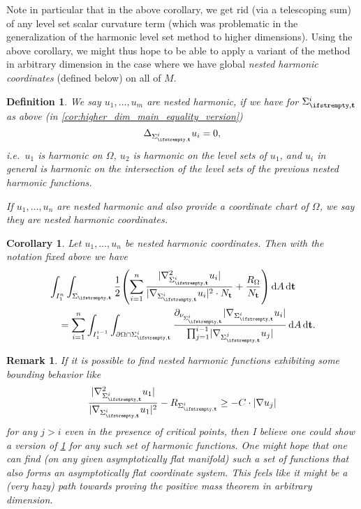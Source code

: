\documentclass[draft]{amsart}
\newtheorem{corollary}[theorem]{Corollary}
\newtheorem{remark}[theorem]{Remark}
\newtheorem{definition}[theorem]{Definition}
\newcommand*{\mathcomma}{,}
\newcommand*{\mathfullstop}{.}
\DeclarePairedDelimiter{\parens}{(}{)}
\let\p\parens %
\newcommand*{\laplacian}{\Delta}
\newcommand*{\boundary}{\partial}
\DeclarePairedDelimiter{\abs}{\lvert}{\rvert} %
\begin{document}
Note in particular that in the above corollary, we get rid (via a telescoping sum) of any level set scalar curvature term (which was problematic in the generalization of the harmonic level set method to higher dimensions). Using the above corollary, we might thus hope to be able to apply a variant of the method in arbitrary dimension in the case where we have global \emph{nested harmonic coordinates} (defined below) on all of \( M \). 

\begin{definition}
    We say \( u_1,\dotsc,u_m \) are \emph{nested harmonic}, if we have for \( \nls^i \) as above (in \cref{cor:higher_dim_main_equality_version})
    \begin{equation*}
        \laplacian_{\nls^i}u_i=0\mathcomma
    \end{equation*}
    i.e.~\( u_1 \) is harmonic on \( \Omega \), \( u_2 \) is harmonic on the level sets of \( u_1 \), and \( u_i \) in general is harmonic on the intersection of the level sets of the previous nested harmonic functions.

    If \( u_1,\dotsc,u_n \) are nested harmonic and also provide a coordinate chart of \( \Omega \), we say they are \emph{nested harmonic coordinates}.
\end{definition}
\begin{corollary}\label{cor:harmonic_higher_dim_main_equality_version}
    Let \( u_1,\dotsc,u_n \) be nested harmonic coordinates. Then with the notation fixed above we have
    \begin{align*}
        &\int_{I_1^n}\int_{\nls}\frac{1}{2}\p*{\sum_{i=1}^{n}\frac{\abs{\nabla_{\nls^i}^2 u_i}}{\abs{\nabla_{\nls^i}u_i}^2\cdot N_{\vect{t}}}+\frac{R_\Omega}{N_{\vect{t}}}}\odif{A}\odif{\vect{t}}\\
        &\quad=\sum_{i=1}^{n}\int_{I_1^{i-1}}\int_{\boundary{\Omega}\cap \nls^i}\frac{\partial_{\nu_{\nls^i}}\abs{\nabla_{\nls^i}u_i}}{\prod_{j=1}^{i-1}\abs{\nabla_{\nls^j}u_j}}\odif{A}\odif{\vect{t}}\mathfullstop
    \end{align*}
\end{corollary}
\begin{remark}
    If it is possible to find nested harmonic functions exhibiting some bounding behavior like
    \begin{equation*}
        \frac{ \abs{\nabla^2_{\nls^i} u_1}}{\abs{\nabla_{\nls^i} u_1}^2}-R_{\nls^i}\geq -C\cdot \abs{\nabla u_j}
    \end{equation*}
    for any \( j>i \) even in the presence of critical points, then I believe one could show a version of \cref{cor:harmonic_higher_dim_main_equality_version} for any such set of harmonic functions. One might hope that one can find (on any given asymptotically flat manifold) such a set of functions that also forms an asymptotically flat coordinate system. This feels like it might be a (very hazy) path towards proving the positive mass theorem in arbitrary dimension.
\end{remark}
\end{document}

